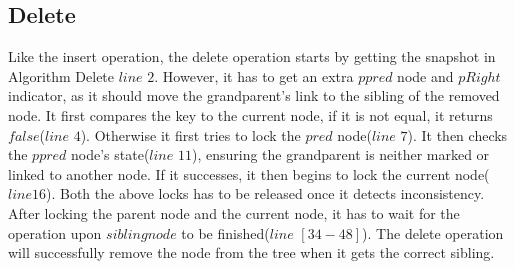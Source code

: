\documentclass{article}
\begin{document}
\subsection{Delete}
Like the insert operation, the delete operation starts by getting the snapshot in Algorithm Delete $line$ $2$. However, it has to get an extra $ppred$ node and $pRight$ indicator, as it should move the grandparent's link to the sibling of the removed node. It first compares the key to the current node, if it is not equal, it returns $false$($line$ $4$). Otherwise it first tries to lock the $pred$ node($line$ $7$). It then checks the $ppred$ node's state($line$ $11$), ensuring the grandparent is neither marked or linked to another node. If it successes, it then begins to lock the current node($line 16$). Both the above locks has to be released once it detects inconsistency. After locking the parent node and the current node, it has to wait for the operation upon $sibling node$ to be finished($line $ $[34-48]$). The delete operation will successfully remove the node from the tree when it gets the correct sibling. 
\end{document}
